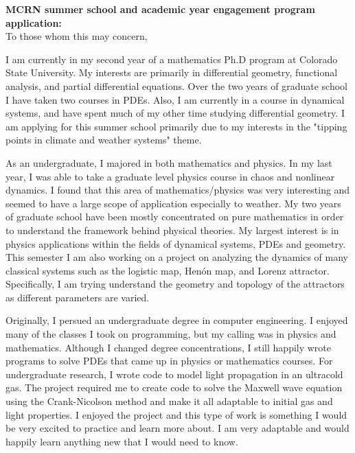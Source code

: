 \documentclass{article}
\begin{document}


\noindent \textbf{MCRN summer school and academic year engagement program application:}\\

\noindent To those whom this may concern,

I am currently in my second year of a mathematics Ph.D program at Colorado State University.  My interests are primarily in differential geometry, functional analysis, and partial differential equations.  Over the two years of graduate school I have taken two courses in PDEs. Also, I am currently in a course in dynamical systems, and have spent much of my other time studying differential geometry.  I am applying for this summer school primarily due to my interests in the "tipping points in climate and weather systems" theme.

As an undergraduate, I majored in both mathematics and physics.  In my last year, I was able to take a graduate level physics course in chaos and nonlinear dynamics.  I found that this area of mathematics/physics was very interesting and seemed to have a large scope of application especially to weather.  My two years of graduate school have been mostly concentrated on pure mathematics in order to understand the framework behind physical theories. My largest interest is in physics applications within the fields of dynamical systems, PDEs and geometry.  This semester I am also working on a project on analyzing the dynamics of many classical systems such as the logistic map, Hen\'on map, and Lorenz attractor.  Specifically, I am trying understand the geometry and topology of the attractors as different parameters are varied. 

Originally, I persued an undergraduate degree in computer engineering. I enjoyed many of the classes I took on programming, but my calling was in physics and mathematics. Although I changed degree concentrations, I still happily wrote programs to solve PDEs that came up in physics or mathematics courses.  For undergraduate research, I wrote code to model light propagation in an ultracold gas. The project required me to create code to solve the Maxwell wave equation using the Crank-Nicolson method and make it all adaptable to initial gas and light properties. I enjoyed the project and this type of work is something I would be very excited to practice and learn more about.  I am very adaptable and would happily learn anything new that I would need to know.
\end{document}
